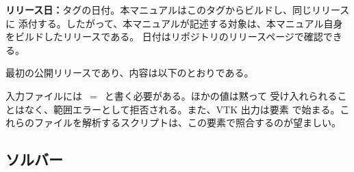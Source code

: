 \textbf{リリース日：}タグの日付。本マニュアルはこのタグからビルドし、同じリリースに
添付する。したがって、本マニュアルが記述する対象は、本マニュアル自身をビルドしたリリースである。
日付はリポジトリのリリースページで確認できる。

最初の公開リリースであり、内容は以下のとおりである。

\begin{note}[入力ファイルと読み取り側で合わせるべき二つの名前]
  入力ファイルには~$=$~と書く必要がある。ほかの値は黙って
  受け入れられることはなく、範囲エラーとして拒否される。また、VTK 出力は要素
  で始まる。これらのファイルを解析するスクリプトは、この要素で照合するのが望ましい。
\end{note}

\subsection*{ソルバー}


